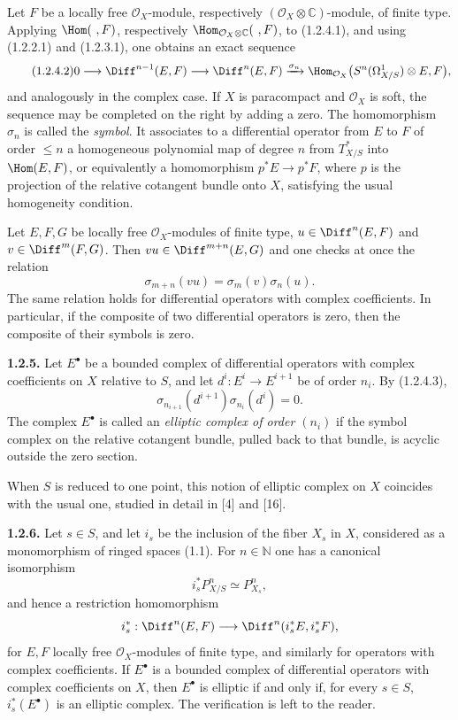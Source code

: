 Let $F$ be a locally free $\mathcal O_X$-module, respectively $(\mathcal O_X\otimes\mathbb C)$-module, of finite type. Applying $\Hom(\ ,F)$, respectively $\Hom_{\mathcal O_X\otimes\mathbb C}(\ ,F)$, to (1.2.4.1), and using (1.2.2.1) and (1.2.3.1), one obtains an exact sequence
\begin{equation}\tag{1.2.4.2}
0\longrightarrow \Diff^{n-1}(E,F)\longrightarrow \Diff^n(E,F)
\xrightarrow{\sigma_n}
\Hom_{\mathcal O_X}\bigl(S^n(\Omega^1_{X/S})\otimes E,F\bigr),
\end{equation}
and analogously in the complex case. If $X$ is paracompact and $\mathcal O_X$ is soft, the sequence may be completed on the right by adding a zero. The homomorphism $\sigma_n$ is called the \emph{symbol}. It associates to a differential operator from $E$ to $F$ of order $\le n$ a homogeneous polynomial map of degree $n$ from $T^*_{X/S}$ into $\Hom(E,F)$, or equivalently a homomorphism $p^*E\to p^*F$, where $p$ is the projection of the relative cotangent bundle onto $X$, satisfying the usual homogeneity condition.

Let $E,F,G$ be locally free $\mathcal O_X$-modules of finite type, $u\in\Diff^n(E,F)$ and $v\in\Diff^m(F,G)$. Then $vu\in\Diff^{m+n}(E,G)$ and one checks at once the relation
\begin{equation}\tag{1.2.4.3}
 \sigma_{m+n}(vu)=\sigma_m(v)\sigma_n(u).
\end{equation}
The same relation holds for differential operators with complex coefficients. In particular, if the composite of two differential operators is zero, then the composite of their symbols is zero.

\textbf{1.2.5.} Let $E^\bullet$ be a bounded complex of differential operators with complex coefficients on $X$ relative to $S$, and let $d^i:E^i\to E^{i+1}$ be of order $n_i$. By (1.2.4.3),
\[
 \sigma_{n_{i+1}}(d^{i+1})\sigma_{n_i}(d^i)=0.
\]
The complex $E^\bullet$ is called an \emph{elliptic complex of order $(n_i)$} if the symbol complex on the relative cotangent bundle, pulled back to that bundle, is acyclic outside the zero section.

When $S$ is reduced to one point, this notion of elliptic complex on $X$ coincides with the usual one, studied in detail in [4] and [16].

\textbf{1.2.6.} Let $s\in S$, and let $i_s$ be the inclusion of the fiber $X_s$ in $X$, considered as a monomorphism of ringed spaces (1.1). For $n\in\mathbb N$ one has a canonical isomorphism
\[
 i_s^*P^n_{X/S}\simeq P^n_{X_s},
\]
and hence a restriction homomorphism
\[
 i_s^*:\Diff^n(E,F)\longrightarrow \Diff^n(i_s^*E,i_s^*F),
\]
for $E,F$ locally free $\mathcal O_X$-modules of finite type, and similarly for operators with complex coefficients. If $E^\bullet$ is a bounded complex of differential operators with complex coefficients on $X$, then $E^\bullet$ is elliptic if and only if, for every $s\in S$, $i_s^*(E^\bullet)$ is an elliptic complex. The verification is left to the reader.

